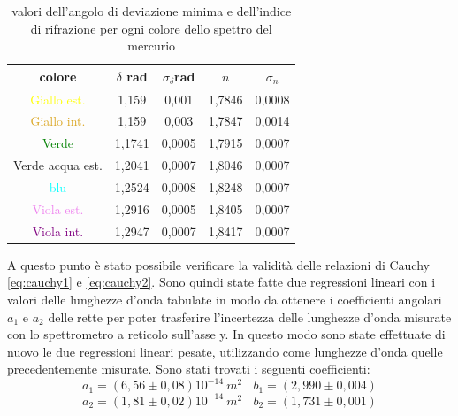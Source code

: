 \documentclass{article}
\begin{document}
        \begin{table}[H]

            \centering
            \begin{tabular}{ c c c c c  }

                \toprule 
                colore & $\delta$ rad & $\sigma_{\delta}$rad & $n$ & $\sigma_n$   \\
                
                \midrule
                \textcolor{yellow}{Giallo est.}	        &   1,159	&	0,001	&	1,7846 &   0,0008\\
                \textcolor{Goldenrod}{Giallo int.}      &   1,159	&	0,003	&	1,7847 &   0,0014\\
                \textcolor{green}{Verde}                &   1,1741	&	0,0005	&	1,7915 &   0,0007\\
                \textcolor{Emerald}{Verde acqua est.}	&   1,2041	&	0,0007	&	1,8046 &	  0,0007\\
                \textcolor{cyan}{blu}                   &   1,2524	&	0,0008	&	 1,8248 &	  0,0007\\
                \textcolor{violet}{Viola est.}          &   1,2916	&	0,0005	&	1,8405 &	  0,0007\\
                \textcolor{purple}{Viola int.}	        &   1,2947	&	0,0007	&	 1,8417 &	  0,0007\\
                \bottomrule

            \end{tabular}

            \caption{valori dell'angolo di deviazione minima e dell'indice di rifrazione per ogni colore dello spettro del mercurio}
            \label{tabular:misure delta e n}

        \end{table}

        A questo punto è stato possibile verificare la validità delle relazioni di Cauchy \ref{eq:cauchy1} e \ref{eq:cauchy2}.
        Sono quindi state fatte due regressioni lineari con i valori delle lunghezze d'onda tabulate in modo da ottenere i coefficienti angolari $a_1$ e $a_2$
        delle rette per poter trasferire l'incertezza delle lunghezze d'onda misurate con lo spettrometro a reticolo sull'asse y. 
        In questo modo sono state effettuate di nuovo le due regressioni lineari pesate, utilizzando come lunghezze d'onda quelle precedentemente misurate. 
        Sono stati trovati i seguenti coefficienti:
        \[a_1 = (6,56 \pm 0,08 )10^{-14}\ m^2\ \ \ \ b_1 = (2,990\pm 0,004)\]
        \[a_2 = (1,81 \pm 0,02 )10^{-14}\ m^2\ \ \ \ b_2 = (1,731\pm 0,001)\]
\end{document}
